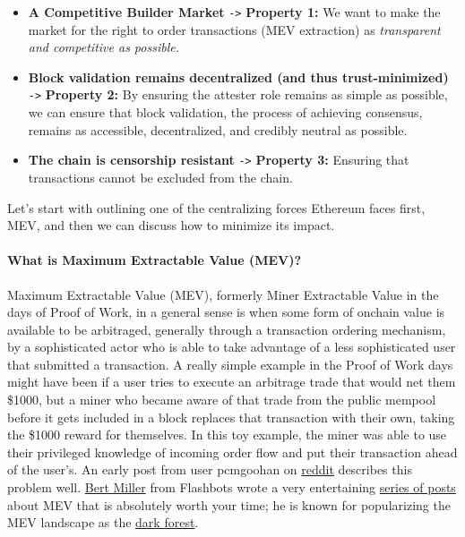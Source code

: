 \documentclass[12pt]{article}
\newcommand{\subsubsubsection}[1]{%
  \paragraph{#1}\mbox{}\par
}
\begin{document}
\begin{itemize}
    \item \textbf{A Competitive Builder Market} \verb|->| \textbf{Property 1: } We want to make the market for the right to order transactions (MEV extraction) as \textit{transparent and competitive as possible.}
    \item \textbf{Block validation remains decentralized (and thus trust-minimized)} \verb|->| \textbf{Property 2: } By ensuring the attester role remains as simple as possible, we can ensure that block validation, the process of achieving consensus, remains as accessible, decentralized, and credibly neutral as possible. 
    \item \textbf{The chain is censorship resistant} \verb|->| \textbf{Property 3: } Ensuring that transactions cannot be excluded from the chain. 
\end{itemize}
\label{Properties}


Let's start with outlining one of the centralizing forces Ethereum faces first, MEV, and then we can discuss how to minimize its impact. 

\subsubsubsection{What is Maximum Extractable Value (MEV)?}
\label{MEV}

Maximum Extractable Value (MEV), formerly Miner Extractable Value in the days of Proof of Work, in a general sense is when some form of onchain value is available to be arbitraged, generally through a transaction ordering mechanism, by a sophisticated actor who is able to take advantage of a less sophisticated user that submitted a transaction. A really simple example in the Proof of Work days might have been if a user tries to execute an arbitrage trade that would net them \$1000, but a miner who became aware of that trade from the public mempool before it gets included in a block replaces that transaction with their own, taking the \$1000 reward for themselves. In this toy example, the miner was able to use their privileged knowledge of incoming order flow and put their transaction ahead of the user's. An early post from user pcmgoohan on \href{https://www.reddit.com/r/ethereum/comments/2d84yv/miners_frontrunning/}{reddit} describes this problem well. \href{https://x.com/bertcmiller}{Bert Miller} from Flashbots wrote a very entertaining \href{https://x.com/bertcmiller/status/1402665992422047747}{series of posts} about MEV that is absolutely worth your time; he is known for popularizing the MEV landscape as the \href{https://bertcmiller.com/glimpse.html}{dark forest}. 
\end{document}
